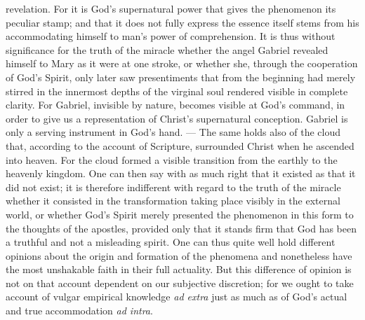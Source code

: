\documentclass[12pt]{book}
\newcommand{\opage}[1]{\marginnote{\footnotesize\textit{[#1]}}}
\begin{document}
revelation. For it is God's supernatural power that gives the phenomenon its
peculiar stamp; and that it does not fully express the essence
\opage{158}
itself stems from his accommodating himself to man's power of comprehension. It
is thus without significance for the truth of the miracle whether the angel
Gabriel revealed himself to Mary as it were at one stroke, or whether she,
through the cooperation of God's Spirit, only later saw presentiments that from
the beginning had merely stirred in the innermost depths of the virginal soul
rendered visible in complete clarity. For Gabriel, invisible by nature, becomes
visible at God's command, in order to give us a representation of Christ's
supernatural conception. Gabriel is only a serving instrument in God's hand. ---
The same holds also of the cloud that, according to the account of Scripture,
surrounded Christ when he ascended into heaven. For the cloud formed a visible
transition from the earthly to the heavenly kingdom. One can then say with as
much right that it existed as that it did not exist; it is therefore indifferent
with regard to the truth of the miracle whether it consisted in the
transformation taking place visibly in the external world, or whether God's
Spirit merely presented the phenomenon in this form to the thoughts of the
apostles, provided only that it stands firm that God has been a truthful and not
a misleading spirit. One can thus quite well hold different opinions about the
origin and formation of the phenomena and nonetheless have the most unshakable
faith in their full actuality. But this difference of opinion is not on that
account dependent on our subjective discretion; for we ought to take account of
vulgar empirical knowledge \textit{ad extra} just as much as of God's actual and
true accommodation \textit{ad intra}.
\end{document}
